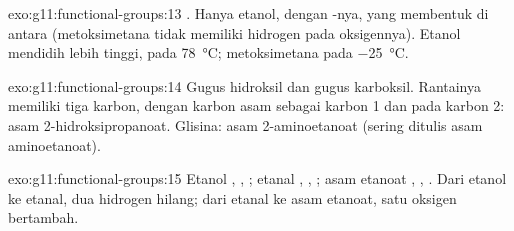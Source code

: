 \begin{solution}{exo:g11:functional-groups:13}
. Hanya etanol, dengan -nya, yang membentuk  di antara  (metoksimetana tidak memiliki
hidrogen pada oksigennya). Etanol mendidih lebih tinggi, pada
\qty{78}{\celsius}; metoksimetana pada \qty{-25}{\celsius}.
\end{solution}

\begin{solution}{exo:g11:functional-groups:14}
Gugus hidroksil dan gugus karboksil. Rantainya memiliki tiga karbon,
dengan karbon asam sebagai karbon 1 dan  pada karbon 2: asam
2-hidroksipropanoat. Glisina: asam 2-aminoetanoat (sering ditulis asam
aminoetanoat).
\end{solution}

\begin{solution}{exo:g11:functional-groups:15}
Etanol , , ; etanal ,
, ; asam etanoat , , . Dari etanol ke etanal, dua  hidrogen hilang; dari
etanal ke asam etanoat, satu  oksigen bertambah.
\end{solution}

